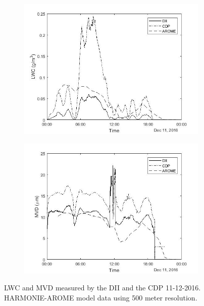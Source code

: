 \begin{figure}[ht]
\centering
\begin{subfigure}[h]{.5\textwidth}
  \centering
  \includegraphics[width=1\linewidth]{figures/161211/30min_lwc_CDP_DII_SMHI_161211_adjusted}
  \label{fig:161211_LWCvstime}
\end{subfigure}%
\begin{subfigure}[h]{.5\textwidth}
  \centering
  \includegraphics[width=1\linewidth]{figures/161211/30min_mvd_CDP_DII_SMHI_161211_adjusted}
  \label{fig:161211_MVDvstime}
\end{subfigure}
\caption{LWC and MVD measured by the DII and the CDP 11-12-2016. HARMONIE-AROME model data using 500 meter resolution. }
\label{fig:161211_mvd_lwc}
\end{figure}

